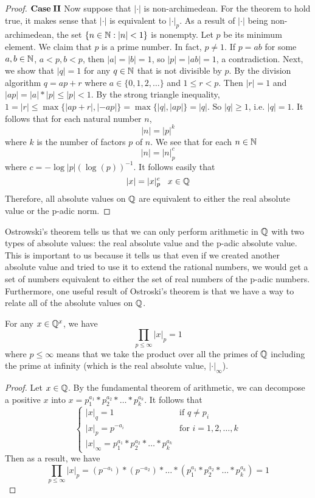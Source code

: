 \documentclass[a4paper]{article}
\begin{document}
\begin{proof}
$\bf{Case\;II}$  Now suppose that \(|\cdot|\) is non-archimedean.  For
the theorem to hold true, it makes sense that \(|\cdot|\) is
equivalent to \(|\cdot|_p\).  As a result of $|\cdot|$ being 
non-archimedean, the set \(\{n\in\mathbb N: |n|<1\}\) is nonempty. 
Let $p$ be its minimum element.  We claim that $p$ is a prime
number.  In fact, $p\neq 1$.  If $p=ab$ for some $a,b\in\mathbb N$,
$a<p,b<p$, then $|a|=|b|=1$, so $|p|=|ab|=1$, a contradiction. 
Next, we show that $|q|=1$ for any $q\in\mathbb N$ that is not
divisible by $p$. By the division algorithm $q=ap+r$ where 
$a\in\{0,1,2,\dots\}$ and $1\leq r<p$.  Then $|r|=1$ and
$|ap|=|a|*|p|\leq|p|<1$.  By the strong triangle inequality,
$1=|r|\leq\max\{|ap+r|,|-ap|\}=\max\{|q|,|ap|\}=|q|.$  So $|q|\geq
1$, i.e. $|q|=1$.  It follows that for each natural number $n$,
\[
	|n|=|p|^k
\]
where $k$ is the number of factors $p$ of $n$.  We see that for
each $n\in\mathbb N$
\[
	|n|=|n|_p^c
\]
where $c=-\log|p|(\log(p))^{-1}$.  It follows easily that 
\[
	|x|=|x|_p^c\;\;\;x\in\mathbb Q
\]
Therefore, all absolute values on $\mathbb Q$ are equivalent to either
the real absolute value or the p-adic norm.
\end{proof}

Ostrowski's theorem tells us that we can only perform arithmetic 
in \(\mathbb Q\) with two types of absolute values: the real absolute 
value and the p-adic absolute value.  This is important to us because 
it tells us that even if we created another absolute value and tried to
use it to extend the rational numbers, we would get a set of numbers
equivalent to either the set of real numbers of the p-adic numbers.
Furthermore, one useful result of Ostroski's theorem is that we have a 
way to relate all of the absolute values on $\mathbb Q$.

\begin{theorem}
For any $x\in\mathbb Q^x$, we have
\[
\prod_{p\leq\infty}|x|_p=1
\]
where $p\leq\infty$ means that we take the product over all the primes
of $\mathbb Q$ including the prime at infinity (which is the real absolute value, 
$|\cdot|_\infty$).
\end{theorem}
\begin{proof}
Let \(x\in\mathbb Q\).  By the fundamental
theorem of arithmetic, we can decompose a positive $x$
into \(x=p_1^{a_1}*p_2^{a_2}*\dots*p_k^{a_k}\).  It follows that
\[
\begin{cases}
  |x|_q=1 & \text{if }q\neq p_i\\
  |x|_p=p^{-a_i} & \text{for }i=1,2,\dots,k\\
  |x|_\infty=p_1^{a_1}*p_2^{a_2}*\dots*p_k^{a_k}
\end{cases}
\]
Then as a result, we have
\[
  \prod_{p\leq\infty}|x|_p=(p^{-a_1})*(p^{-a_2})*\dots
  *(p_1^{a_1}*p_2^{a_2}*\dots*p_k^{a_k})=1
\]
\end{proof}
\end{document}
